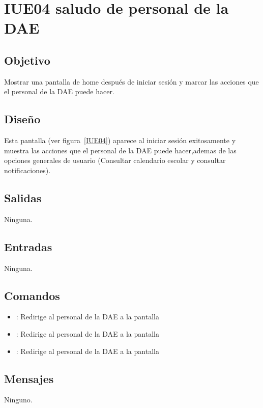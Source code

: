 \section{IUE04 saludo de personal de la DAE}

\subsection{Objetivo}
Mostrar una pantalla de home después de iniciar sesión y marcar las acciones que el personal de la DAE puede hacer.

\subsection{Diseño}
Esta pantalla  (ver figura~\ref{IUE04}) aparece al iniciar sesión exitosamente y muestra las acciones que el personal de la DAE puede hacer,ademas de las opciones generales de usuario (Consultar calendario escolar y consultar notificaciones). 


\subsection{Salidas}

Ninguna.

\subsection{Entradas}
Ninguna.

\subsection{Comandos}
\begin{itemize}
	\item {}: Redirige al personal de la DAE a la pantalla 
	\item {}: Redirige al personal de la DAE a la pantalla 
	\item {}: Redirige al personal de la DAE a la pantalla 
	
\end{itemize}

\subsection{Mensajes}

\begin{Citemize}
	\item Ninguno.
\end{Citemize}

